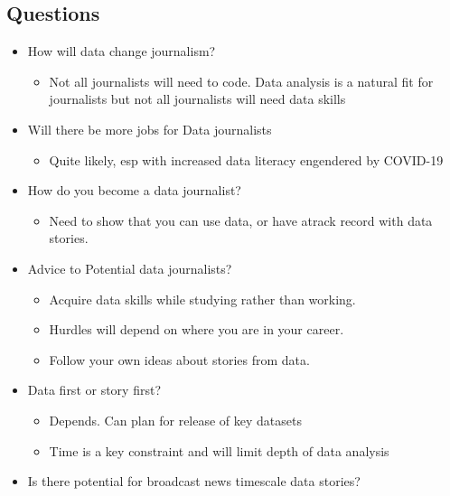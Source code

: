 \documentclass[
  letterpaper,
  DIV=11,
  numbers=noendperiod]{scrartcl}
\providecommand{\tightlist}{%
  \setlength{\itemsep}{0pt}\setlength{\parskip}{0pt}}
\begin{document}
\hypertarget{questions}{%
\subsection{Questions}\label{questions}}

\begin{itemize}
\tightlist
\item
  How will data change journalism?

  \begin{itemize}
  \tightlist
  \item
    Not all journalists will need to code. Data analysis is a natural
    fit for journalists but not all journalists will need data skills
  \end{itemize}
\item
  Will there be more jobs for Data journalists

  \begin{itemize}
  \tightlist
  \item
    Quite likely, esp with increased data literacy engendered by
    COVID-19
  \end{itemize}
\item
  How do you become a data journalist?

  \begin{itemize}
  \tightlist
  \item
    Need to show that you can use data, or have atrack record with data
    stories.
  \end{itemize}
\item
  Advice to Potential data journalists?

  \begin{itemize}
  \item
    Acquire data skills while studying rather than working.
  \item
    Hurdles will depend on where you are in your career.
  \item
    Follow your own ideas about stories from data.
  \end{itemize}
\item
  Data first or story first?

  \begin{itemize}
  \item
    Depends. Can plan for release of key datasets
  \item
    Time is a key constraint and will limit depth of data analysis
  \end{itemize}
\item
  Is there potential for broadcast news timescale data stories?


\end{itemize}
\end{document}
